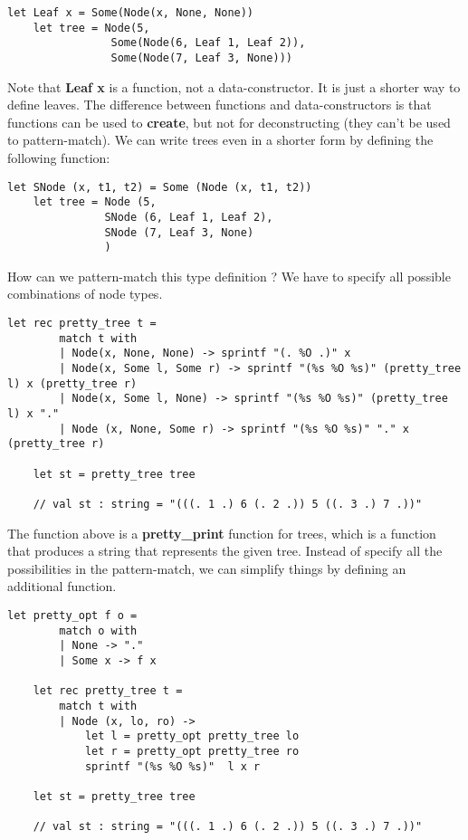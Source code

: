 \newline
\begin{lstlisting}[style = FSharpStyle]
    let Leaf x = Some(Node(x, None, None))
    let tree = Node(5,
                Some(Node(6, Leaf 1, Leaf 2)),
                Some(Node(7, Leaf 3, None)))
\end{lstlisting}
Note that \textbf{Leaf x} is a function, not a data-constructor. It is just a shorter way to define leaves. The difference between functions and data-constructors is that functions can be used to \textbf{create}, but not for deconstructing (they can't be used to pattern-match).\newline\newline
We can write trees even in a shorter form by defining the following function:
\begin{lstlisting}[style = FSharpStyle]
    let SNode (x, t1, t2) = Some (Node (x, t1, t2))
    let tree = Node (5, 
               SNode (6, Leaf 1, Leaf 2), 
               SNode (7, Leaf 3, None)
               )
\end{lstlisting}
How can we pattern-match this type definition ? We have to specify all possible combinations of node types.
\begin{lstlisting}[style = FSharpStyle]
    let rec pretty_tree t = 
        match t with
        | Node(x, None, None) -> sprintf "(. %O .)" x
        | Node(x, Some l, Some r) -> sprintf "(%s %O %s)" (pretty_tree l) x (pretty_tree r)
        | Node(x, Some l, None) -> sprintf "(%s %O %s)" (pretty_tree l) x "."
        | Node (x, None, Some r) -> sprintf "(%s %O %s)" "." x (pretty_tree r)
        
    let st = pretty_tree tree

    // val st : string = "(((. 1 .) 6 (. 2 .)) 5 ((. 3 .) 7 .))"
\end{lstlisting}
The function above is a \textbf{pretty\_print} function for trees, which is a function that produces a string that represents the given tree. Instead of specify all the possibilities in the pattern-match, we can simplify things by defining an additional function. 
\begin{lstlisting}[style = FSharpStyle]
    let pretty_opt f o = 
        match o with 
        | None -> "."
        | Some x -> f x

    let rec pretty_tree t =
        match t with
        | Node (x, lo, ro) -> 
            let l = pretty_opt pretty_tree lo
            let r = pretty_opt pretty_tree ro
            sprintf "(%s %O %s)"  l x r
    
    let st = pretty_tree tree

    // val st : string = "(((. 1 .) 6 (. 2 .)) 5 ((. 3 .) 7 .))"
\end{lstlisting}
